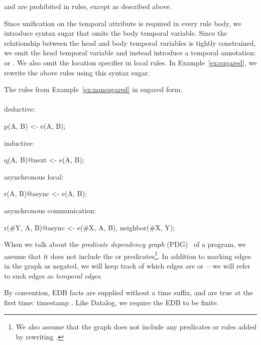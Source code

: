  and  are prohibited in rules, except as described above.

Since unification on the temporal attribute is required in every rule body,
we introduce syntax sugar that omits the body temporal variable.  Since the relationship between the head and body temporal variables is tightly constrained, we omit the head temporal variable and instead introduce a temporal annotation:  or .  We also omit the location specifier in local rules.  In Example~\ref{ex:sugared}, we rewrite the above rules using this syntax sugar.

\begin{example}
\label{ex:sugared}
The rules from Example~\ref{ex:nonsugared} in sugared form.
\\\\
deductive:\\
\begin{Dedalus}
p(A, B) <- e(A, B);
\end{Dedalus}
inductive:\\
\begin{Dedalus}
q(A, B)@next <- e(A, B);
\end{Dedalus}
asynchronous local:\\
\begin{Dedalus}
r(A, B)@async <- e(A, B);
\end{Dedalus}
asynchronous communication:\\
\begin{Dedalus}
r(#Y, A, B)@async <- e(#X, A, B), neighbor(#X, Y);
\end{Dedalus}
\end{example}

When we talk about the {\em predicate dependency graph} (PDG)~\cite{ullmanbook} of a \lang program, we assume that it does not include the  or  predicates\footnote{We also assume that the graph does not include any predicates or rules added by rewriting .}.  In addition to marking edges in the graph as negated, we will keep track of which edges are  or ---we will refer to such edges as {\em temporal edges}.


\vspace{1em}
By convention, EDB facts are supplied without a time suffix, and are true at the first time: timestamp .  Like Datalog, we require the EDB to be finite.

